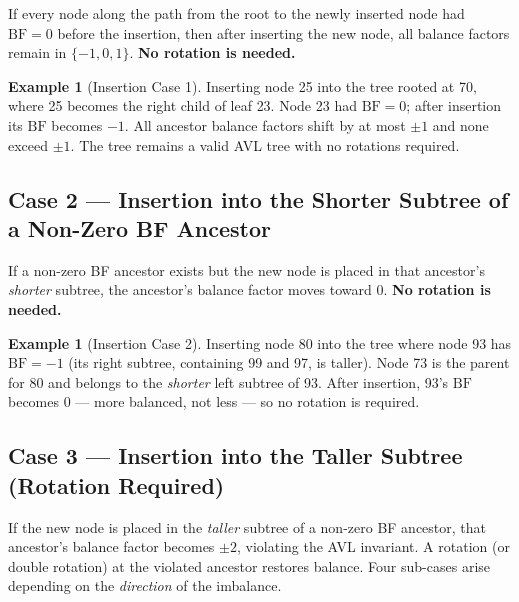 \documentclass[11pt, a4paper, notitlepage]{report}
\theoremstyle{definition}
\theoremstyle{remark}
\theoremstyle{definition}
\newtheorem{example}[theorem]{Example}
\begin{document}
If every node along the path from the root to the newly inserted node had $\text{BF} = 0$
before the insertion, then after inserting the new node, all balance factors remain in
$\{-1, 0, 1\}$.  \textbf{No rotation is needed.}

\begin{example}[Insertion Case 1]
\label{ex:avl-case1}
Inserting node 25 into the tree rooted at 70, where 25 becomes the right child of leaf 23.
Node 23 had $\text{BF} = 0$; after insertion its $\text{BF}$ becomes $-1$.  All ancestor
balance factors shift by at most $\pm 1$ and none exceed $\pm 1$.  The tree remains a valid
AVL tree with no rotations required.
\end{example}

\subsection{Case 2 --- Insertion into the Shorter Subtree of a Non-Zero BF Ancestor}
\label{subsec:avl-case2}

If a non-zero BF ancestor exists but the new node is placed in that ancestor's
\emph{shorter} subtree, the ancestor's balance factor moves toward 0.  \textbf{No
rotation is needed.}

\begin{example}[Insertion Case 2]
\label{ex:avl-case2}
Inserting node 80 into the tree where node 93 has $\text{BF} = -1$ (its right subtree,
containing 99 and 97, is taller).  Node 73 is the parent for 80 and belongs to the
\emph{shorter} left subtree of 93.  After insertion, 93's $\text{BF}$ becomes 0 --- more
balanced, not less --- so no rotation is required.
\end{example}

\subsection{Case 3 --- Insertion into the Taller Subtree (Rotation Required)}
\label{subsec:avl-case3}

If the new node is placed in the \emph{taller} subtree of a non-zero BF ancestor, that
ancestor's balance factor becomes $\pm 2$, violating the AVL invariant.  A rotation (or
double rotation) at the violated ancestor restores balance.  Four sub-cases arise depending
on the \emph{direction} of the imbalance.
\end{document}
